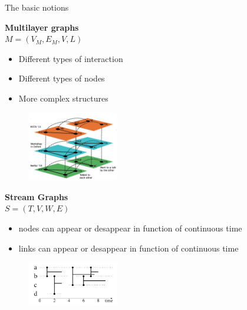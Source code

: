 \documentclass[15pt]{beamer}
\begin{document}
\begin{frame}{The basic notions}
\begin{minipage}[t]{5cm}
\textbf{Multilayer graphs}
\\
$M=(V_M,E_M,V,L)$
\\
\begin{itemize}
    \item Different types of interaction
    \item Different types of nodes
    \item More complex structures
\end{itemize}
\begin{figure}
    \centering
    \includegraphics[width=4cm]{img/exMulti.JPG}
    \label{fig:exmulti}
\end{figure}
\end{minipage}
\begin{minipage}[t]{5cm}
\textbf{Stream Graphs}
\\
$S=(T,V,W,E)$
\begin{itemize}
    \item nodes can appear or desappear in function of continuous time
    \item links can appear or desappear in function of continuous time
\end{itemize}
\begin{figure}
    \centering
    \includegraphics[width=4cm]{img/exampleStream.JPG}
    \label{fig:exstream}
\end{figure}
\end{minipage}

\end{frame}
\end{document}
